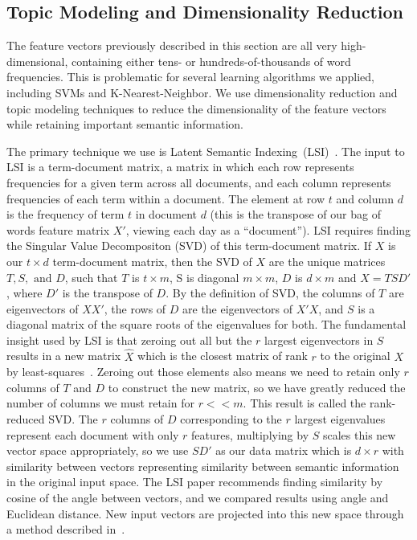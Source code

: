 \documentclass[10pt, twocolumn]{article}
\begin{document}
\subsection{Topic Modeling and Dimensionality Reduction}
\label{sec:topicmodel}

The feature vectors previously described in this section are all very high-dimensional, containing either tens- or hundreds-of-thousands of word frequencies. This is problematic for several learning algorithms we applied, including SVMs and K-Nearest-Neighbor. We use dimensionality reduction and topic modeling techniques to reduce the dimensionality of the feature vectors while retaining important semantic information.

The primary technique we use is Latent Semantic Indexing~(LSI)~\cite{lsi}. The input to LSI is a term-document matrix, a matrix in which each row represents frequencies for a given term across all documents, and each column represents frequencies of each term within a document. The element at row $t$ and column $d$ is the frequency of term $t$ in document $d$ (this is the transpose of our bag of words feature matrix $X'$, viewing each day as a ``document''). LSI requires finding the Singular Value Decompositon (SVD) of this term-document matrix. If $X$ is our $t \times d$ term-document matrix, then the SVD of $X$ are the unique matrices $T, S, \text{ and } D$, such that $T$ is $t \times m$, S is diagonal $m \times m$, $D$ is $d \times m$ and $X = T S D'$, where $D'$ is the transpose of $D$. By the definition of SVD, the columns of $T$ are eigenvectors of $X X'$, the rows of $D$ are the eigenvectors of $X' X$, and $S$ is a diagonal matrix of the square roots of the eigenvalues for both. The fundamental insight used by LSI is that zeroing out all but the $r$ largest eigenvectors in $S$ results in a new matrix $\hat{X}$ which is the closest matrix of rank $r$ to the original $X$ by least-squares~\cite{lsi}. Zeroing out those elements also means we need to retain only $r$ columns of $T$ and $D$ to construct the new matrix, so we have greatly reduced the number of columns we must retain for $r << m$. This result is called the rank-reduced SVD. The $r$ columns of $D$ corresponding to the $r$ largest eigenvalues represent each document with only $r$ features, multiplying by $S$ scales this new vector space appropriately, so we use $S D'$ as our data matrix which is $d \times r$ with similarity between vectors representing similarity between semantic information in the original input space. The LSI paper recommends finding similarity by cosine of the angle between vectors, and we compared results using angle and Euclidean distance. New input vectors are projected into this new space through a method described in~\cite{lsi}.
\end{document}
